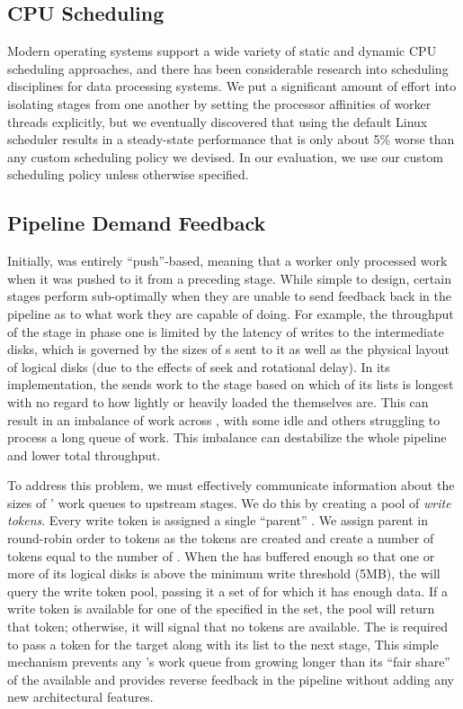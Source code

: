 \subsection{CPU Scheduling}

Modern operating systems support a wide variety of static and dynamic CPU
scheduling approaches, and there has been considerable research into scheduling
disciplines for data processing systems.  We put a significant amount of effort
into isolating stages from one another by setting the processor affinities of
worker threads explicitly, but we eventually discovered that using the default
Linux scheduler results in a steady-state performance that is only about 5\%
worse than any custom scheduling policy we devised.  In our evaluation, we use
our custom scheduling policy unless otherwise specified.

\subsection{Pipeline Demand Feedback}

Initially, \tritonsort was entirely ``push''-based, meaning that a worker only
processed work when it was pushed to it from a preceding stage.  While simple
to design, certain stages perform sub-optimally when they are unable to send
feedback back in the pipeline as to what work they are capable of doing.  For
example, the throughput of the \writer stage in phase one is limited by the
latency of writes to the intermediate disks, which is governed by the sizes of
\writerbuffer{}s sent to it as well as the physical layout of logical disks
(due to the effects of seek and rotational delay).  In its \naive
implementation, the \ldts sends work to the \writer stage based on which of its
\ldbuffer lists is longest with no regard to how lightly or heavily loaded the
\writers themselves are.  This can result in an imbalance of work across
\writers, with some \writers idle and others struggling to process a long queue
of work.  This imbalance can destabilize the whole pipeline and lower total
throughput.

To address this problem, we must effectively communicate information about the
sizes of \writers' work queues to upstream stages.  We do this by creating a
pool of \emph{write tokens}. Every write token is assigned a single ``parent''
\writer. We assign parent \writers in round-robin order to tokens as the tokens
are created and create a number of tokens equal to the number of
\writerbuffers.
When the \ldts has buffered enough \ldbuffers so that one or more of its logical
disks is above the minimum write threshold (5MB), the \ldts will query the
write token pool, passing it a set of \writers for which it has enough data.
If a write token is available for one of the specified \writers in the set, the
pool will return that token; otherwise, it will signal that no tokens are
available.  The \ldts is required to pass a token for the target \writer along
with its \ldbuffer list to the next stage, This simple mechanism prevents any
\writer's work queue from growing longer than its ``fair share'' of the
available \writerbuffers and provides reverse feedback in the pipeline without
adding any new architectural features.

